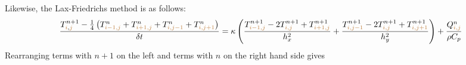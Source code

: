 Likewise, the Lax-Friedrichs method is as follows:
\begin{equation}
\frac{T_{{\color{brown}i},{\color{brown}j}}^{n+1}-
\frac{1}{4} \left(  
T_{{\color{brown}i-1,j}}^{n}  +
T_{{\color{brown}i+1,j}}^{n}  +
T_{{\color{brown}i,j-1}}^{n}  +
T_{{\color{brown}i,j+1}}^{n}  
\right)
}{\delta t}
= \kappa
\left(
\frac{ T_{{\color{brown}i-1,j}}^{n+1}-2T_{{\color{brown}i,j}}^{n+1}+T_{{\color{brown}i+1,j}}^{n+1} }{h_x^2} + 
\frac{ T_{{\color{brown}i,j-1}}^{n+1}-2T_{{\color{brown}i,j}}^{n+1}+T_{{\color{brown}i,j+1}}^{n+1} }{h_y^2}
\right)
+\frac{Q_{{\color{brown}i,j}}^n}{\rho C_p}
\end{equation}
Rearranging terms with $n+1$ on the left and terms with $n$ on the right hand side gives








